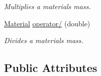 \begin{DoxyCompactItemize}
\begin{DoxyCompactList}\small\item\em Multiplies a material\textquotesingle{}s mass. \end{DoxyCompactList}\item 
\mbox{\label{classpyne_1_1_material_ac9b6ba67915ed4adb763b1c68ef5eb98}} 
\hyperlink{classpyne_1_1_material}{Material} \hyperlink{classpyne_1_1_material_ac9b6ba67915ed4adb763b1c68ef5eb98}{operator/} (double)
\begin{DoxyCompactList}\small\item\em Divides a material\textquotesingle{}s mass. \end{DoxyCompactList}\end{DoxyCompactItemize}
\subsection*{Public Attributes}
